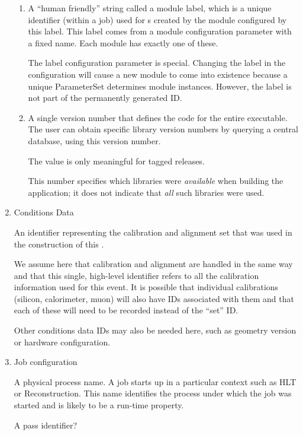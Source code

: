 \documentclass[draftmode]{memarticle}
\newcommand{\EDProduct}{\classname{ED\-Product}}
\begin{document}
\begin{enumerate}
\begin{enumerate}
    \item

    A ``human friendly'' string called a module label, which is
    a unique identifier (within a job) used for \EDProduct{}s 
    created by the module
    configured by this label.
    This label comes from a module configuration
    parameter with a fixed name.
    Each module has exactly one of these.

    The label configuration parameter is special.
    Changing the label in the configuration will cause a new 
    module to come into existence because a unique ParameterSet
    determines module instances.  However, the label is not
    part of the permanently generated ID.

    \item

    A single version number
    that defines the code
    for the entire executable.
    The user can obtain specific library version numbers
    by querying a central database,
    using this version number.

    The value is only meaningful for tagged releases.

    This number specifies which libraries
    were \emph{available} when building the application;
    it does not indicate that \emph{all} such libraries were used.
    \end{enumerate}

  \item Conditions Data

    An identifier representing the calibration and alignment set
    that was used in the construction of this \EDProduct.

    We assume here that calibration and alignment are handled in the
    same way and that this single, high-level identifier refers to all the
    calibration information used for this event. It is possible that
    individual calibrations (\eg silicon, calorimeter, muon) will also
    have IDs associated with them and that each of these will need to
    be recorded instead of the ``set'' ID.

    Other conditions data IDs may also be needed here, such as
    geometry version or hardware configuration.

  \item Job configuration

    A physical process name.  A job starts up in a particular context
    such as HLT or Reconstruction. This name identifies the process
    under which the job was started and is likely to be a run-time
    property.

    \begin{fixme}
    A pass identifier?
    \end{fixme}

\end{enumerate}
\end{document}
